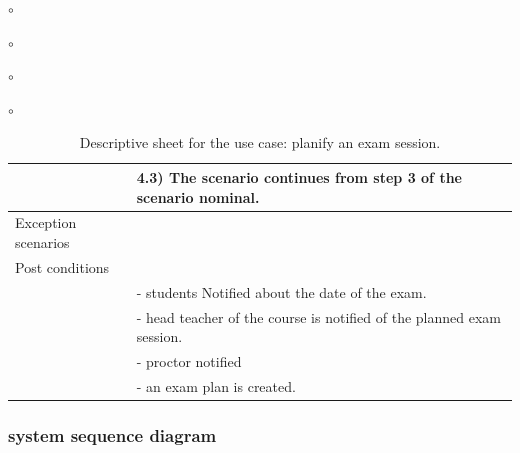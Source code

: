 \documentclass[]{uc2pfecaneva}
\begin{document}
\begin{list}{$\circ$}{}
\begin{list}{$\circ$}{}
\begin{list}{$\circ$}{}
\begin{list}{$\circ$}{}
\begin{table}[t]
\begin{tabularx}{\textwidth}{|l|X|}
            & \hspace{4mm}4.3) The scenario continues from step 3 of the scenario nominal.                                                                                      \\ \hline
            Exception scenarios   &                                                                                                                                                                   \\ \hline
            Post conditions       &                                                                                                                                                                   \\
            & - students Notified about the date of the exam.                                                                                                                   \\
            & - head teacher of the course is notified of the planned exam session.                                                                                             \\
            & - proctor notified                                                                                           \\
            & - an exam plan is created.                                                                                                                               \\ \hline
        \end{tabularx}
        \caption{Descriptive sheet for the use case: planify an exam session.}
        \label{table:2}
    \end{table}
    \clearpage

    \subsubsection{system sequence diagram}
    \begin{figure}[h]


\end{figure}
\end{list}
\end{list}
\end{list}
\end{list}
\end{document}
